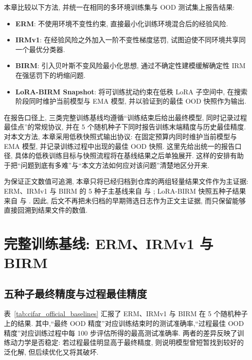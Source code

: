 \documentclass[a4paper,punct=banjiao,twoside]{ctexrep}
\theoremstyle{plain}
\theoremstyle{definition}
\theoremstyle{remark}
\begin{document}
本章比较以下方法, 并统一在相同的多环境训练集与 OOD 测试集上报告结果:
\begin{itemize}
    \item \textbf{ERM}: 不使用环境不变性约束, 直接最小化训练环境混合后的经验风险.
    \item \textbf{IRMv1}: 在经验风险之外加入一阶不变性梯度惩罚, 试图迫使不同环境共享同一个最优分类器.
    \item \textbf{BIRM}: 引入贝叶斯不变风险最小化思想, 通过不确定性建模缓解确定性 IRM 在强惩罚下的坍缩问题.
    \item \textbf{LoRA-BIRM Snapshot}: 将可训练扰动约束在低秩 LoRA 子空间中, 在搜索阶段同时维护当前模型与 EMA 模型, 并以验证到的最佳 OOD 快照作为输出.
\end{itemize}

在报告口径上, 三类完整训练基线均遵循“训练结束后给出最终模型, 同时记录过程最佳点”的常规协议, 并在 5 个随机种子下同时报告训练末端精度与历史最佳精度. 对本文方法, 本章采用低秩快照式输出协议: 在固定预算内同时维护当前模型与 EMA 模型, 并记录训练过程中出现的最佳 OOD 快照. 这里先给出统一的报告口径, 具体的低秩训练目标与快照流程将在基线结果之后单独展开. 这样的安排有助于把“问题到底有多难”与“本文方法如何应对该问题”清楚地区分开来.

为保证正文数值可追溯, 本章只将已经归档到仓库的两组轻量结果文件作为主证据: ERM、IRMv1 与 BIRM 的 5 种子主基线来自  与 ; LoRA-BIRM 快照五种子结果来自  与 . 因此, 后文不再把未归档的早期筛选日志作为正文主证据, 而只保留能够直接回溯到结果文件的数值.

\section{完整训练基线: ERM、IRMv1 与 BIRM}
\subsection{五种子最终精度与过程最佳精度}

表~\ref{tab:cifar_official_baselines} 汇报了 ERM、IRMv1 与 BIRM 在 5 个随机种子上的结果. 其中,“最终 OOD 精度”对应训练结束时的测试准确率,“过程最佳 OOD 精度”对应训练过程中每 100 步评估所得的最高测试准确率. 两者的差异反映了训练动力学是否稳定: 若过程最佳明显高于最终精度, 则说明模型曾短暂找到较好的泛化解, 但后续优化又将其破坏.
\end{document}
